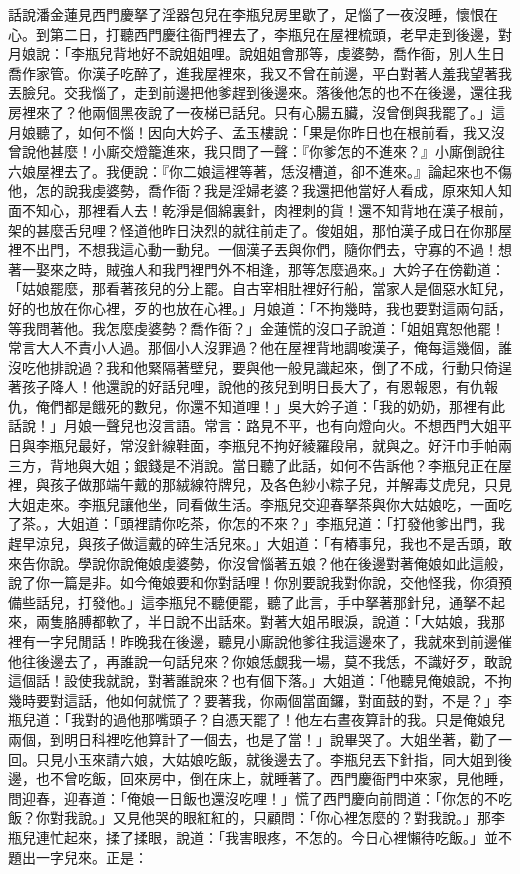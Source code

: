\begin{showcontents}{}
話說潘金蓮見西門慶拏了淫器包兒在李瓶兒房里歇了，足惱了一夜沒睡，懷恨在心。到第二日，打聽西門慶往衙門裡去了，李瓶兒在屋裡梳頭，老早走到後邊，對月娘說：「李瓶兒背地好不說姐姐哩。說姐姐會那等，虔婆勢，喬作衙，別人生日喬作家管。你漢子吃醉了，進我屋裡來，我又不曾在前邊，平白對著人羞我望著我丟臉兒。交我惱了，走到前邊把他爹趕到後邊來。落後他怎的也不在後邊，還往我房裡來了？他兩個黑夜說了一夜梯已話兒。只有心腸五臟，沒曾倒與我罷了。」這月娘聽了，如何不惱！因向大妗子、孟玉樓說：「果是你昨日也在根前看，我又沒曾說他甚麼！小廝交燈籠進來，我只問了一聲：『你爹怎的不進來？』小廝倒說往六娘屋裡去了。我便說：『你二娘這裡等著，恁沒槽道，卻不進來。』論起來也不傷他，怎的說我虔婆勢，喬作衙？我是淫婦老婆？我還把他當好人看成，原來知人知面不知心，那裡看人去！乾淨是個綿裏針，肉裡刺的貨！還不知背地在漢子根前，架的甚麼舌兒哩？怪道他昨日決烈的就往前走了。俊姐姐，那怕漢子成日在你那屋裡不出門，不想我這心動一動兒。一個漢子丟與你們，隨你們去，守寡的不過！想著一娶來之時，賊強人和我門裡門外不相逢，那等怎麼過來。」大妗子在傍勸道：「姑娘罷麼，那看著孩兒的分上罷。自古宰相肚裡好行船，當家人是個惡水缸兒，好的也放在你心裡，歹的也放在心裡。」月娘道：「不拘幾時，我也要對這兩句話，等我問著他。我怎麼虔婆勢？喬作衙？」金蓮慌的沒口子說道：「姐姐寬恕他罷！常言大人不責小人過。那個小人沒罪過？他在屋裡背地調唆漢子，俺每這幾個，誰沒吃他排說過？我和他緊隔著壁兒，要與他一般見識起來，倒了不成，行動只倚逞著孩子降人！他還說的好話兒哩，說他的孩兒到明日長大了，有恩報恩，有仇報仇，俺們都是餓死的數兒，你還不知道哩！」吳大妗子道：「我的奶奶，那裡有此話說！」月娘一聲兒也沒言語。常言：路見不平，也有向燈向火。不想西門大姐平日與李瓶兒最好，常沒針線鞋面，李瓶兒不拘好綾羅段帛，就與之。好汗巾手帕兩三方，背地與大姐；銀錢是不消說。當日聽了此話，如何不告訴他？李瓶兒正在屋裡，與孩子做那端午戴的那絨線符牌兒，及各色紗小粽子兒，并解毒艾虎兒，只見大姐走來。李瓶兒讓他坐，同看做生活。李瓶兒交迎春拏茶與你大姑娘吃，一面吃了茶。，大姐道：「頭裡請你吃茶，你怎的不來？」李瓶兒道：「打發他爹出門，我趕早涼兒，與孩子做這戴的碎生活兒來。」大姐道：「有樁事兒，我也不是舌頭，敢來告你說。學說你說俺娘虔婆勢，你沒曾惱著五娘？他在後邊對著俺娘如此這般，說了你一篇是非。如今俺娘要和你對話哩！你別要說我對你說，交他怪我，你須預備些話兒，打發他。」這李瓶兒不聽便罷，聽了此言，手中拏著那針兒，通拏不起來，兩隻胳膊都軟了，半日說不出話來。對著大姐吊眼淚，說道：「大姑娘，我那裡有一字兒閒話！昨晚我在後邊，聽見小廝說他爹往我這邊來了，我就來到前邊催他往後邊去了，再誰說一句話兒來？你娘恁覷我一場，莫不我恁，不識好歹，敢說這個話！設使我就說，對著誰說來？也有個下落。」大姐道：「他聽見俺娘說，不拘幾時要對這話，他如何就慌了？要著我，你兩個當面鑼，對面鼓的對，不是？」李瓶兒道：「我對的過他那嘴頭子？自憑天罷了！他左右晝夜算計的我。只是俺娘兒兩個，到明日科裡吃他算計了一個去，也是了當！」說畢哭了。大姐坐著，勸了一回。只見小玉來請六娘，大姑娘吃飯，就後邊去了。李瓶兒丟下針指，同大姐到後邊，也不曾吃飯，回來房中，倒在床上，就睡著了。西門慶衙門中來家，見他睡，問迎春，迎春道：「俺娘一日飯也還沒吃哩！」慌了西門慶向前問道：「你怎的不吃飯？你對我說。」又見他哭的眼紅紅的，只顧問：「你心裡怎麼的？對我說。」那李瓶兒連忙起來，揉了揉眼，說道：「我害眼疼，不怎的。今日心裡懶待吃飯。」並不題出一字兒來。正是：


\end{showcontents}
